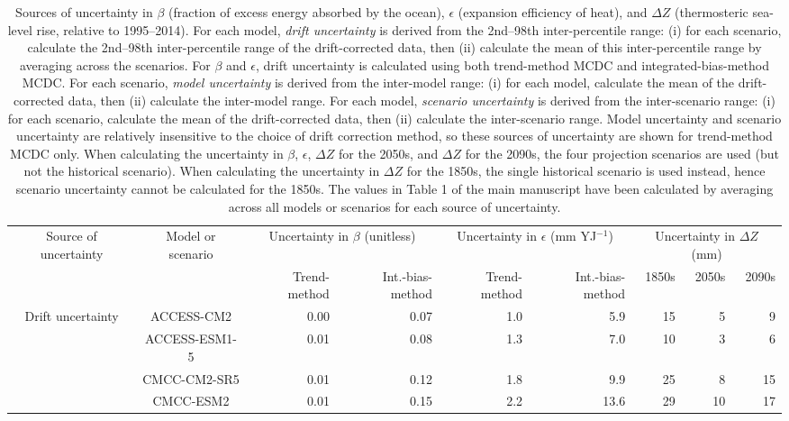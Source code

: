 \begin{table*}[t]
\centering
\caption{Sources of uncertainty in $\beta$ (fraction of excess energy absorbed by the ocean), $\epsilon$ (expansion efficiency of heat), and ${\Delta}Z$ (thermosteric sea-level rise, relative to 1995--2014). For each model, \emph{drift uncertainty} is derived from the 2nd--98th inter-percentile range: (i) for each scenario, calculate the 2nd--98th inter-percentile range of the drift-corrected data, then (ii) calculate the mean of this inter-percentile range by averaging across the scenarios. For $\beta$ and $\epsilon$, drift uncertainty is calculated using both trend-method MCDC and integrated-bias-method MCDC. For each scenario, \emph{model uncertainty} is derived from the inter-model range: (i) for each model, calculate the mean of the drift-corrected data, then (ii) calculate the inter-model range. For each model, \emph{scenario uncertainty} is derived from the inter-scenario range: (i) for each scenario, calculate the mean of the drift-corrected data, then (ii) calculate the inter-scenario range. Model uncertainty and scenario uncertainty are relatively insensitive to the choice of drift correction method, so these sources of uncertainty are shown for trend-method MCDC only. When calculating the uncertainty in $\beta$, $\epsilon$, ${\Delta}Z$ for the 2050s, and ${\Delta}Z$ for the 2090s, the four projection scenarios are used (but not the historical scenario). When calculating the uncertainty in ${\Delta}Z$ for the 1850s, the single historical scenario is used instead, hence scenario uncertainty cannot be calculated for the 1850s. The values in Table 1 of the main manuscript have been calculated by averaging across all models or scenarios for each source of uncertainty.}
\begin{tabular}{c|c|rr|rr|rrr}
\toprule
Source of uncertainty & Model or scenario & \multicolumn{2}{c|}{Uncertainty in $\beta$ (unitless)} & \multicolumn{2}{c|}{Uncertainty in $\epsilon$ (mm YJ$^{-1}$)} & \multicolumn{3}{c}{Uncertainty in ${\Delta}Z$ (mm)} \\
 &  & Trend-method & Int.-bias-method & Trend-method & Int.-bias-method & 1850s & 2050s & 2090s \\
\midrule
\multirow[c]{20}{*}{Drift uncertainty} & ACCESS-CM2 & 0.00 & 0.07 & 1.0 & 5.9 & 15 & 5 & 9 \\
 & ACCESS-ESM1-5 & 0.01 & 0.08 & 1.3 & 7.0 & 10 & 3 & 6 \\
 & CMCC-CM2-SR5 & 0.01 & 0.12 & 1.8 & 9.9 & 25 & 8 & 15 \\
 & CMCC-ESM2 & 0.01 & 0.15 & 2.2 & 13.6 & 29 & 10 & 17 \\

\end{tabular}
\end{table*}
